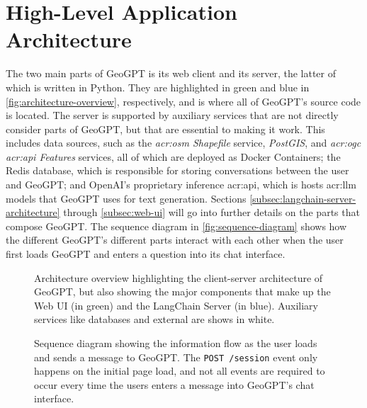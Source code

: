 \section{High-Level Application Architecture}
\label{sec:high-level-application-architecture}

The two main parts of GeoGPT is its web client and its server, the latter of which is written in Python. They are highlighted in green and blue in \autoref{fig:architecture-overview}, respectively, and is where all of GeoGPT's source code is located. The server is supported by auxiliary services that are not directly consider parts of GeoGPT, but that are essential to making it work. This includes data sources, such as the \textit{\acrshort{acr:osm} Shapefile} service, \textit{PostGIS}, and \textit{\acrshort{acr:ogc} \acrshort{acr:api} Features} services, all of which are deployed as Docker Containers; the Redis database, which is responsible for storing conversations between the user and GeoGPT; and OpenAI's proprietary inference \acrshort{acr:api}, which is hosts \acrshort{acr:llm} models that GeoGPT uses for text generation. Sections \ref{subsec:langchain-server-architecture} through \ref{subsec:web-ui} will go into further details on the parts that compose GeoGPT. The sequence diagram in \autoref{fig:sequence-diagram} shows how the different GeoGPT's different parts interact with each other when the user first loads GeoGPT and enters a question into its chat interface.

\begin{figure}
    \centering
    \caption[Architecture overview for GeoGPT]{Architecture overview highlighting the client-server architecture of GeoGPT, but also showing the major components that make up the Web UI (in green) and the LangChain Server (in blue). Auxiliary services like databases and external  are shows in white.}
    \label{fig:architecture-overview}
\end{figure}

\begin{figure}
    \caption[Sequence diagram for GeoGPT]{Sequence diagram showing the information flow as the user loads and sends a message to GeoGPT. The \texttt{POST /session} event only happens on the initial page load, and not all events are required to occur every time the users enters a message into GeoGPT's chat interface.}
    \label{fig:sequence-diagram}
\end{figure}



